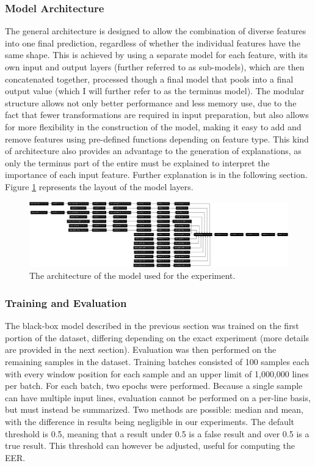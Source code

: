 \documentclass{article}
\begin{document}
			\subsubsection{Model Architecture}
			The general architecture is designed to allow the combination of diverse features into
			one final prediction, regardless of whether the individual features have the same
			shape. This is achieved by using a separate model for each feature, with its own input
			and output layers (further referred to as sub-models), which are then concatenated
			together, processed though a final model that pools into a final output value (which I
			will further refer to as the terminus model). The modular structure allows not only
			better performance and less memory use, due to the fact that fewer transformations are
			required in input preparation, but also allows for more flexibility in the
			construction of the model, making it easy to add and remove features using pre-defined
			functions depending on feature type. This kind of architecture also provides an
			advantage to the generation of explanations, as only the terminus part of the entire
			must be explained to interpret the importance of each input feature. Further
			explanation is in the following section. Figure \ref{fig:model_plot} represents the
			layout of the model layers.
			\begin{figure}[htbp]
				\begin{center}
					\includegraphics[width=1\textwidth]{images/model_plot.png}
					\caption{The architecture of the model used for the experiment.}
					\label{fig:model_plot}
				\end{center}
			\end{figure}
			\subsubsection{Training and Evaluation}
			The black-box model described in the previous section was trained on the first portion
			of the dataset, differing depending on the exact experiment (more details are provided
			in the next section). Evaluation was then performed on the remaining samples in the
			dataset. Training batches consisted of 100 samples each with every window position for
			each sample and an upper limit of 1,000,000 lines per batch. For each batch, two
			epochs were performed. Because a single sample can have multiple input lines,
			evaluation cannot be performed on a per-line basis, but must instead be summarized.
			Two methods are possible: median and mean, with the difference in results being
			negligible in our experiments. The default threshold is 0.5, meaning that a result
			under 0.5 is a false result and over 0.5 is a true result. This threshold can however
			be adjusted, useful for computing the EER.
\end{document}
